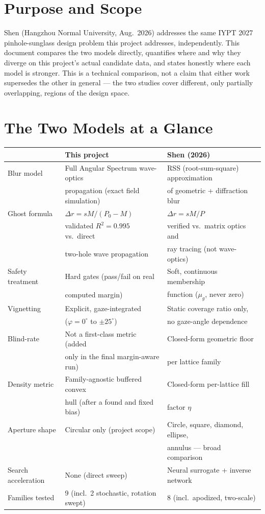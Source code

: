 \section{Purpose and Scope}

Shen (Hangzhou Normal University, Aug.\ 2026) addresses the same IYPT 2027
pinhole-sunglass design problem this project addresses, independently. This
document compares the two models directly, quantifies where and why they
diverge on this project's actual candidate data, and states honestly where
each model is stronger. This is a technical comparison, not a claim that
either work supersedes the other in general --- the two studies cover
different, only partially overlapping, regions of the design space.

\section{The Two Models at a Glance}
\begin{center}
\begin{tabular}{lll}
\toprule
& \textbf{This project} & \textbf{Shen (2026)} \\
\midrule
Blur model & Full Angular Spectrum wave-optics & RSS (root-sum-square) approximation \\
& propagation (exact field simulation) & of geometric + diffraction blur \\
Ghost formula & $\Delta r = sM/(P_0-M)$ & $\Delta r = sM/P$ \\
& validated $R^2{=}0.995$ vs.\ direct & verified vs.\ matrix optics and \\
& two-hole wave propagation & ray tracing (not wave-optics) \\
Safety treatment & Hard gates (pass/fail on real & Soft, continuous membership \\
& computed margin) & function ($\mu_g$, never zero) \\
Vignetting & Explicit, gaze-integrated & Static coverage ratio only, \\
& ($\varphi=0^\circ$ to $\pm25^\circ$) & no gaze-angle dependence \\
Blind-rate & Not a first-class metric (added & Closed-form geometric floor \\
& only in the final margin-aware run) & per lattice family \\
Density metric & Family-agnostic buffered convex & Closed-form per-lattice fill \\
& hull (after a found and fixed bias) & factor $\eta$ \\
Aperture shape & Circular only (project scope) & Circle, square, diamond, ellipse, \\
& & annulus --- broad comparison \\
Search acceleration & None (direct sweep) & Neural surrogate + inverse network \\
Families tested & 9 (incl.\ 2 stochastic, rotation swept) & 8 (incl.\ apodized, two-scale) \\
\bottomrule
\end{tabular}
\end{center}

\newpage
